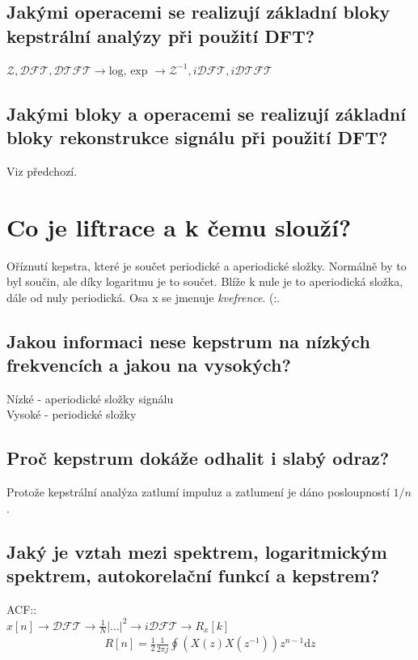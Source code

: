 \documentclass[a4paper,12pt]{article}   %
\newcommand{\mt}[1]{$#1$}
\newcommand{\dd}{\text{d}}
\begin{document}
\subsection{Jakými operacemi se realizují základní bloky kepstrální analýzy při použití DFT?}

\mt{\mathscr{Z}, \mathscr{DFT}, \mathscr{DTFT} \rightarrow \text{log, exp }\rightarrow \mathscr{Z}^{-1}, i\mathscr{DFT}, i\mathscr{DTFT}}


\subsection{Jakými bloky a operacemi se realizují základní bloky rekonstrukce signálu při použití DFT?}

Viz předchozí.


\section{Co je liftrace a k čemu slouží?}

Oříznutí kepstra, které je součet periodické a aperiodické složky. Normálně by to byl součin, ale díky logaritmu je to součet. Blíže k nule je to aperiodická složka, dále od nuly periodická. Osa x se jmenuje \textit{kvefrence}. (:.


\subsection{Jakou informaci nese kepstrum na nízkých frekvencích a jakou na vysokých?}

Nízké - aperiodické složky signálu\\
Vysoké - periodické složky


\subsection{Proč kepstrum dokáže odhalit i slabý odraz?}

Protože kepstrální analýza zatlumí impuluz a zatlumení je dáno posloupností \mt{1/n}.


\subsection{Jaký je vztah mezi spektrem, logaritmickým spektrem, autokorelační funkcí a kepstrem?}

ACF::\\
\mt{x[n] \rightarrow \mathscr{DFT} \rightarrow \frac{1}{N}|\dots|^2 \rightarrow i\mathscr{DFT} \rightarrow R_x[k]}
\begin{align*}
        R[n] = \frac{1}{2}\frac{1}{2\pi j}\oint (X(z)X(z^{-1}))z^{n-1}\dd z
\end{align*}
\end{document}
